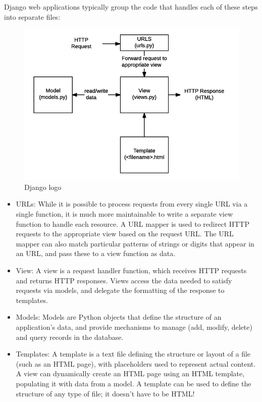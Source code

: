 Django web applications typically group the code that handles each of these steps into separate files:\\
\begin{figure}[h]
	\centering \includegraphics[scale=1]{input/images/django1.png}
	\caption{Django logo}
\end{figure}
\begin{itemize}
	\item URLs: While it is possible to process requests from every single URL via a single function, it is much more maintainable to write a separate view function to handle each resource. A URL mapper is used to redirect HTTP requests to the appropriate view based on the request URL. The URL mapper can also match particular patterns of strings or digits that appear in an URL, and pass these to a view function as data.
	\item View: A view is a request handler function, which receives HTTP requests and returns HTTP responses. Views access the data needed to satisfy requests via models, and delegate the formatting of the response to templates.
	\item Models: Models are Python objects that define the structure of an application's data, and provide mechanisms to manage (add, modify, delete) and query records in the database. 
	\item Templates: A template is a text file defining the structure or layout of a file (such as an HTML page), with placeholders used to represent actual content. A view can dynamically create an HTML page using an HTML template, populating it with data from a model. A template can be used to define the structure of any type of file; it doesn't have to be HTML!
\end{itemize}

